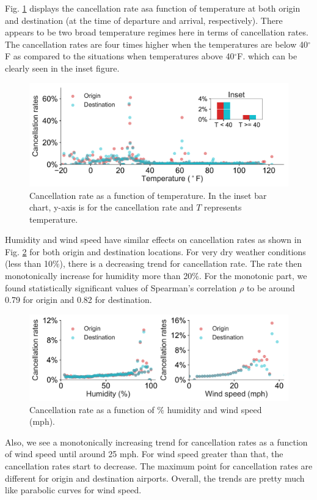 \documentclass[12pt]{article}
\begin{document}
Fig. \ref{fig:tempcanrate} displays the cancellation rate asa function of temperature at both origin and destination (at the time of departure and arrival, respectively). There appears to be two broad temperature regimes here in terms of cancellation rates. The cancellation rates are four times higher when the temperatures are below 40$^\circ$F as compared to the situations when temperatures above 40$^\circ$F. which can be clearly seen in the inset figure. 
\begin{figure}[h!]
\begin{center}
\includegraphics[width=6in]{temperature_canrate.pdf}
\end{center}
\caption{\label{fig:tempcanrate}
Cancellation rate as a function of temperature. In the inset bar chart, y-axis is for the cancellation rate and $T$ represents temperature.}
\end{figure}
Humidity and wind speed have similar effects on cancellation rates as shown in Fig. \ref{fig:humwindcanrate} for both origin and destination locations. For very dry weather conditions (less than 10$\%$), there is a decreasing trend for cancellation rate. The rate then monotonically increase for humidity more than 20$\%$. For the monotonic part, we found statistically significant values of Spearman's correlation $\rho$ to be around 0.79 for origin and 0.82 for destination. 
\begin{figure}[h!]
\begin{center}
\includegraphics[width=6in]{humidity_windspeed_canrate.pdf}
\end{center}
\caption{\label{fig:humwindcanrate}
Cancellation rate as a function of $\%$ humidity and wind speed (mph).}
\end{figure}
Also, we see a monotonically increasing trend for cancellation rates as a function of wind speed until around 25 mph. For wind speed greater than that, the cancellation rates start to decrease. The maximum point for cancellation rates are different for origin and destination airports. Overall, the trends are pretty much like parabolic curves for wind speed.
\end{document}
